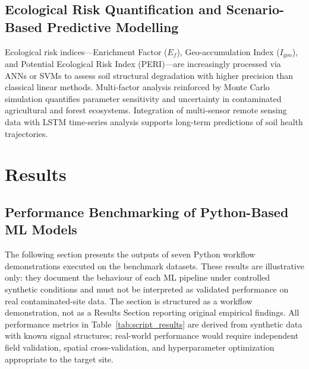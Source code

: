 \documentclass[environremediat,article,accept,pdftex,oneauthor]{Definitions/mdpi}
\begin{document}
\subsection{Ecological Risk Quantification and Scenario-Based Predictive
    Modelling}\label{sec4.2}

{Ecological risk indices---Enrichment Factor ($E_f$), Geo-accumulation Index ($I_{\text{geo}}$), and Potential Ecological Risk Index (PERI)---are increasingly processed via ANNs or SVMs to assess soil structural degradation with higher precision than classical linear methods. Multi-factor analysis reinforced by Monte Carlo simulation quantifies parameter sensitivity and uncertainty in contaminated agricultural and forest ecosystems. Integration of multi-sensor remote sensing data with LSTM time-series analysis supports long-term predictions of soil health trajectories.}

\section{Results}\label{sec5}

\subsection{Performance Benchmarking of Python-Based ML Models}\label{sec5.1}

{The following section presents the outputs of seven Python workflow demonstrations executed on the benchmark datasets. These results are illustrative only: they document the behaviour of each ML pipeline under controlled synthetic conditions and must not be interpreted as validated performance on real contaminated-site data. The section is structured as a workflow demonstration, not as a Results Section reporting original empirical findings. All performance metrics in Table~\ref{tab:script_results} are derived from synthetic data with known signal structures; real-world performance would require independent field validation, spatial cross-validation, and hyperparameter optimization appropriate to the target site.}
\end{document}
